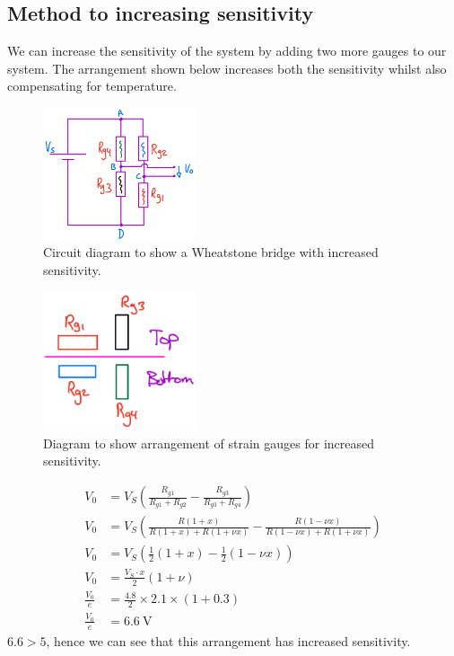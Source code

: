 \documentclass[12pt]{article}
\numberwithin{equation}{section}
\begin{document}
\subsection*{Method to increasing sensitivity}
We can increase the sensitivity of the system by adding two more gauges to our system. The arrangement shown below increases both the sensitivity whilst also compensating for temperature.
\begin{figure}[H]
  \centering
  \includegraphics[width=0.4\textwidth]{./img/4-4circuit.png}
  \caption{Circuit diagram to show a Wheatstone bridge with increased sensitivity.}
\end{figure}
\begin{figure}[H]
  \centering
  \includegraphics[width=0.4\textwidth]{./img/4-4arrangement.png}
  \caption{Diagram to show arrangement of strain gauges for increased sensitivity.}
\end{figure}
\begin{align}
  V_0 &= V_S \left(\frac{R_{g1}}{R_{g1} + R_{g2}} - \frac{R_{g3}}{R_{g3} + R_{g4}}\right)\\
  V_0 &= V_S \left(\frac{R(1+x)}{R(1+x) + R(1+\nu x)} - \frac{R(1-\nu x)}{R(1-\nu x) + R(1+\nu x)}\right)\\
  V_0 &= V_S \left(\frac{1}{2}(1+x) - \frac{1}{2}(1-\nu x)\right)\\
  V_0 &= \frac{V_S \cdot x}{2} \left(1 + \nu \right)\\
  \frac{V_0}{e} &= \frac{4.8}{2} \times 2.1\times  (1 + 0.3)\\
  \frac{V_0}{e} &= \SI{6.6}{\volt}
\end{align}
$6.6 > 5$, hence we can see that this arrangement has increased sensitivity.
\end{document}
